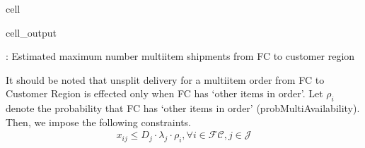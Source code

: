 \documentclass[letterpaper,10pt,english]{jupyterBook}
\begin{document}
\begin{sphinxuseclass}{cell}
\begin{sphinxVerbatimOutput}
\begin{sphinxuseclass}{cell_output}
\end{sphinxuseclass}\end{sphinxVerbatimOutput}

\end{sphinxuseclass}
\sphinxAtStartPar
{}: Estimated maximum number multi\sphinxhyphen{}item shipments from FC  to customer region 

\sphinxAtStartPar
It should be noted that unsplit delivery for a multi\sphinxhyphen{}item order from FC  to Customer Region  is effected only when FC  has ‘other items in order’. Let \(\rho_i\) denote the probability that FC  has ‘other items in order’ (probMultiAvailability). Then, we impose the following constraints.
\begin{equation*}
\begin{split} x_{ij} \leq D_j \cdot \lambda_j \cdot \rho_i, \forall i\in\mathcal{FC}, j\in \mathcal{J} \end{split}
\end{equation*}
\end{document}
